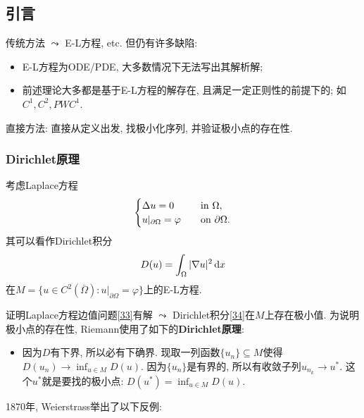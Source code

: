 \subsection{引言}

传统方法 $\leadsto$ E-L方程, etc. 但仍有许多缺陷:
\begin{itemize}
    \item E-L方程为ODE/PDE, 大多数情况下无法写出其解析解;
    \item 前述理论大多都是基于E-L方程的解存在, 且满足一定正则性的前提下的; 如$C^1, C^2, PWC^1$.
\end{itemize}

直接方法: 直接从定义出发, 找极小化序列, 并验证极小点的存在性.

\subsubsection{Dirichlet原理}

\begin{example}
    考虑Laplace方程
    \begin{equation}\label{33}
        \begin{cases}
            \Delta u = 0 \quad &{\rm in} \ \Omega, \\ 
            u|_{\partial\Omega} = \varphi \quad &{\rm on}\ \partial\Omega.
        \end{cases}
    \end{equation}
    其可以看作Dirichlet积分
    \begin{equation}\label{34}
        D(u) = \int_{\Omega}|\nabla u|^2 \,{\rm d}x
    \end{equation}
    在$M = \{u \in C^2(\overline{\Omega})\colon u|_{\partial\Omega} = \varphi\}$上的E-L方程.
\end{example}

证明Laplace方程边值问题\eqref{33}有解 $\leadsto$ Dirichlet积分\eqref{34}在$M$上存在极小值.
为说明极小点的存在性, Riemann使用了如下的\textbf{Dirichlet原理}:

\begin{itemize}
    \item 因为$D$有下界, 所以必有下确界. 现取一列函数$\{u_n\} \subseteq M$使得$D(u_n) \rightarrow \inf_{u \in M}D(u)$.
    因为$\{u_n\}$是有界的, 所以有收敛子列$u_{n_k} \rightarrow u^*$. 这个$u^*$就是要找的极小点: $D(u^*) = \inf_{u \in M}D(u)$.
\end{itemize}

1870年, Weierstrass举出了以下反例:

